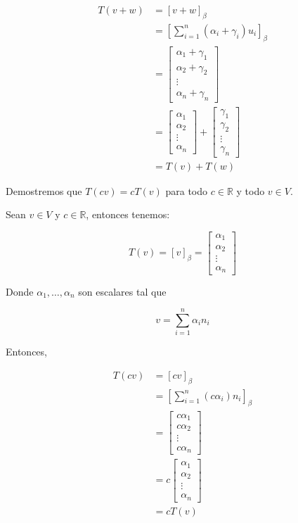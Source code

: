 \documentclass{report}
\begin{document}
\begin{enumerate}
        \begin{align*}
        T(v + w) &= [v + w]_\beta \\
        &= \left[\sum_{i=1}^{n} (\alpha_i + \gamma_i) u_i\right]_\beta \\
        &= \begin{bmatrix}
            \alpha_1 + \gamma_1\\ \alpha_2 + \gamma_2\\ \vdots \\ \alpha_n + \gamma_n
        \end{bmatrix} \\
        &= \begin{bmatrix}
            \alpha_1\\ \alpha_2\\ \vdots \\ \alpha_n
        \end{bmatrix} + \begin{bmatrix}
            \gamma_1\\ \gamma_2\\ \vdots \\ \gamma_n
        \end{bmatrix} \\
        &= T(v) + T(w)
        \end{align*}

        Demostremos que $T(cv) = cT(v)$ para todo $c \in \mathbb{R}$ y todo $v \in V$.

        Sean $v \in V$ y $c \in \mathbb{R}$, entonces tenemos:

        $$T(v) = [v]_\beta = \begin{bmatrix}
            \alpha_1\\ \alpha_2\\ \vdots \\ \alpha_n
        \end{bmatrix}$$

        Donde $\alpha_1,\dots, \alpha_n$ son escalares tal que

        $$v = \sum_{i=1}^{n} \alpha_i n_i$$

        Entonces,

        \begin{align*}
        T(cv) &= [cv]_\beta \\
        &= \left[\sum_{i=1}^{n} (c\alpha_i) n_i\right]_\beta \\
        &= \begin{bmatrix}
            c\alpha_1\\ c\alpha_2\\ \vdots \\ c\alpha_n
        \end{bmatrix} \\
        &= c\begin{bmatrix}
            \alpha_1\\ \alpha_2\\ \vdots \\ \alpha_n
        \end{bmatrix} \\
        &= cT(v)
        \end{align*}


\end{enumerate}
\end{document}
